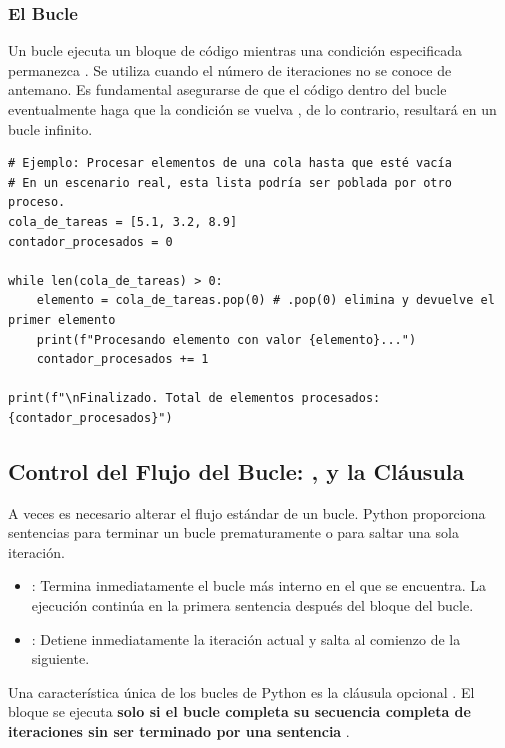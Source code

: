 \subsubsection*{El Bucle }
Un bucle  ejecuta un bloque de código mientras una condición especificada permanezca . Se utiliza cuando el número de iteraciones no se conoce de antemano. Es fundamental asegurarse de que el código dentro del bucle eventualmente haga que la condición se vuelva , de lo contrario, resultará en un bucle infinito.

\text{ }\begin{verbatim}
# Ejemplo: Procesar elementos de una cola hasta que esté vacía
# En un escenario real, esta lista podría ser poblada por otro proceso.
cola_de_tareas = [5.1, 3.2, 8.9]
contador_procesados = 0

while len(cola_de_tareas) > 0:
    elemento = cola_de_tareas.pop(0) # .pop(0) elimina y devuelve el primer elemento
    print(f"Procesando elemento con valor {elemento}...")
    contador_procesados += 1

print(f"\nFinalizado. Total de elementos procesados: {contador_procesados}")
\end{verbatim}

\subsection{Control del Flujo del Bucle: ,  y la Cláusula }
\label{subsec:loop_control}
A veces es necesario alterar el flujo estándar de un bucle. Python proporciona sentencias para terminar un bucle prematuramente o para saltar una sola iteración.

\begin{itemize}
    \item {}: Termina inmediatamente el bucle más interno en el que se encuentra. La ejecución continúa en la primera sentencia después del bloque del bucle.
    \item {}: Detiene inmediatamente la iteración actual y salta al comienzo de la siguiente.
\end{itemize}

Una característica única de los bucles de Python es la cláusula opcional . El bloque  se ejecuta \textbf{solo si el bucle completa su secuencia completa de iteraciones sin ser terminado por una sentencia }.

